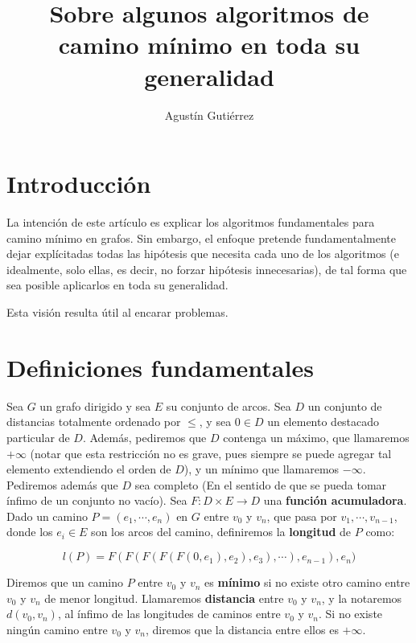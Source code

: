 \documentclass{article}
\title{Sobre algunos algoritmos de camino mínimo en toda su generalidad}
\author{Agustín Gutiérrez}
\date{}
\begin{document}
\maketitle

\pagebreak

\tableofcontents

\pagebreak

\section{Introducción}

La intención de este artículo es explicar los algoritmos fundamentales para camino mínimo en grafos.
Sin embargo, el enfoque pretende fundamentalmente dejar explícitadas todas las hipótesis que necesita
cada uno de los algoritmos (e idealmente, solo ellas, es decir, no forzar hipótesis innecesarias), de
tal forma que sea posible aplicarlos en toda su generalidad.

Esta visión resulta útil al encarar problemas.

\section{Definiciones fundamentales}

Sea $G$ un grafo dirigido y sea $E$ su conjunto de arcos. Sea $D$ un conjunto de distancias totalmente ordenado por $\leq$, y sea $0 \in D$ un
elemento destacado particular de $D$. Además, pediremos que $D$ contenga un máximo, que llamaremos $+\infty$
(notar que esta restricción no es grave, pues siempre se puede agregar tal elemento extendiendo el orden de $D$), y un
mínimo que llamaremos $-\infty$.
Pediremos además que $D$ sea completo (En el sentido de que se pueda tomar ínfimo de un conjunto no vacío).
Sea $F : D \times E \rightarrow D$ una \textbf{función acumuladora}. Dado un camino $P = (e_1,\cdots,e_n)$ en $G$
entre $v_0$ y $v_n$, que pasa por $v_1, \cdots, v_{n-1}$, donde los $e_i \in E$ son los arcos del camino,
definiremos la \textbf{longitud} de $P$ como:

$$l(P) = F(F(F(F(F(0,e_1),e_2),e_3),\cdots),e_{n-1}),e_n)$$

Diremos que un camino $P$ entre $v_0$ y $v_n$ es \textbf{mínimo} si no existe otro camino entre $v_0$ y $v_n$ de menor
longitud. Llamaremos \textbf{distancia} entre $v_0$ y $v_n$, y la notaremos $d(v_0,v_n)$, al ínfimo de las longitudes
de caminos entre $v_0$ y $v_n$. Si no existe ningún camino entre $v_0$ y $v_n$, diremos que la distancia entre ellos es $+\infty$.
\end{document}
